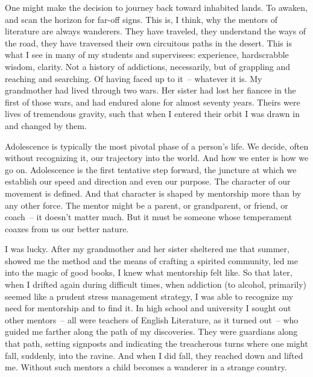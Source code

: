 \documentclass[10pt,DIV09,letterpaper,oneside,headsepline]{scrreprt}
\begin{document}
One might make the decision to journey back toward inhabited lands. To awaken, and scan the horizon for far-off signs. This is, I think, why the mentors of literature are always wanderers. They have traveled, they understand the ways of the road, they have traversed their own circuitous paths in the desert. This is what I see in many of my students and supervisees: experience, hardscrabble wisdom, clarity. Not a history of addictions, necessarily, but of grappling and reaching and searching. Of having faced up to it~-- whatever it is. My grandmother had lived through two wars. Her sister had lost her fiancee in the first of those wars, and had endured alone for almost seventy years. Theirs were lives of tremendous gravity, such that when I entered their orbit I was drawn in and changed by them.

Adolescence is typically the most pivotal phase of a person's life. We decide, often without recognizing it, our trajectory into the world. And how we enter is how we go on. Adolescence is the first tentative step forward, the juncture at which we establish our speed and direction and even our purpose. The character of our movement is defined. And that character is shaped by mentorship more than by any other force. The mentor might be a parent, or grandparent, or friend, or coach~-- it doesn't matter much. But it must be someone whose temperament coaxes from us our better nature.

I was lucky. After my grandmother and her sister sheltered me that summer, showed me the method and the means of crafting a spirited community, led me into the magic of good books, I knew what mentorship felt like. So that later, when I drifted again during difficult times, when addiction (to alcohol, primarily) seemed like a prudent stress management strategy, I was able to recognize my need for mentorship and to find it. In high school and university I sought out other mentors~-- all were teachers of English Literature, as it turned out~-- who guided me farther along the path of my discoveries. They were guardians along that path, setting signposts and indicating the treacherous turns where one might fall, suddenly, into the ravine. And when I did fall, they reached down and lifted me. Without such mentors a child becomes a wanderer in a strange country.
\end{document}

